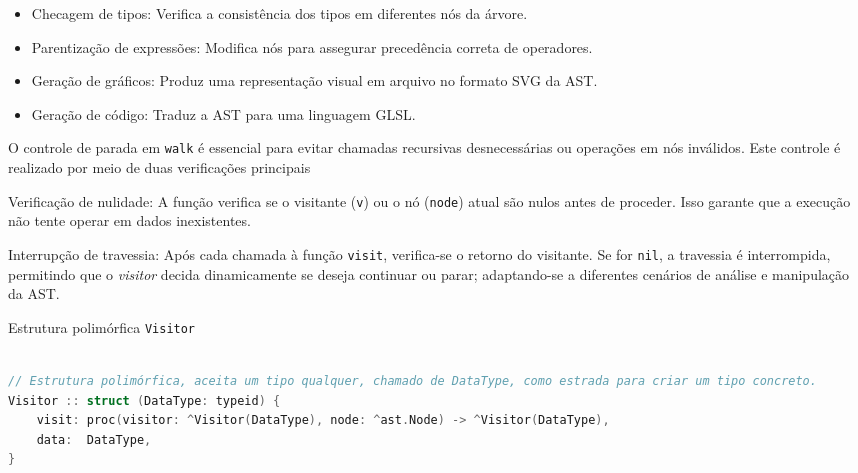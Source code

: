 \begin{itemize}
    \item Checagem de tipos: Verifica a consistência dos tipos em diferentes nós da árvore.
    \item Parentização de expressões: Modifica nós para assegurar precedência correta de operadores.
    \item Geração de gráficos: Produz uma representação visual em arquivo no formato SVG da AST.
    \item Geração de código: Traduz a AST para uma linguagem GLSL.
\end{itemize}

O controle de parada em \texttt{walk} é essencial para evitar chamadas recursivas desnecessárias ou operações em nós inválidos. Este controle é realizado por meio de duas verificações principais

Verificação de nulidade: A função verifica se o visitante (\texttt{v}) ou o nó (\texttt{node}) atual são nulos antes de proceder. Isso garante que a execução não tente operar em dados inexistentes.

Interrupção de travessia: Após cada chamada à função \texttt{visit}, verifica-se o retorno do visitante. Se for \texttt{nil}, a travessia é interrompida, permitindo que o \textit{visitor} decida dinamicamente se deseja continuar ou parar; adaptando-se a diferentes cenários de análise e manipulação da AST.



\begin{codigo}[!ht]
    \caption{\small Estrutura polimórfica \texttt{Visitor}}
        \label{cod-visitor-struct}
\begin{lstlisting}[language = C]

// Estrutura polimórfica, aceita um tipo qualquer, chamado de DataType, como estrada para criar um tipo concreto.
Visitor :: struct (DataType: typeid) {
    visit: proc(visitor: ^Visitor(DataType), node: ^ast.Node) -> ^Visitor(DataType),
    data:  DataType,
}
\end{lstlisting}
\end{codigo}

